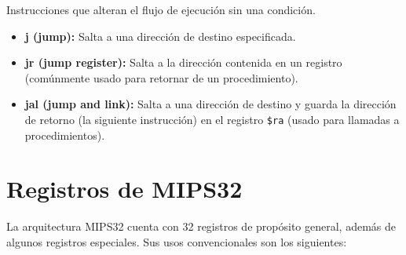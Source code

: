 \documentclass{article}
\begin{document}
Instrucciones que alteran el flujo de ejecución sin una condición.
\begin{itemize}
    \item \textbf{j (jump):} Salta a una dirección de destino especificada.
    \item \textbf{jr (jump register):} Salta a la dirección contenida en un registro (comúnmente usado para retornar de un procedimiento).
    \item \textbf{jal (jump and link):} Salta a una dirección de destino y guarda la dirección de retorno (la siguiente instrucción) en el registro \texttt{\$ra} (usado para llamadas a procedimientos).
\end{itemize}

\section*{Registros de MIPS32}

La arquitectura MIPS32 cuenta con 32 registros de propósito general, además de algunos registros especiales. Sus usos convencionales son los siguientes:
\end{document}
